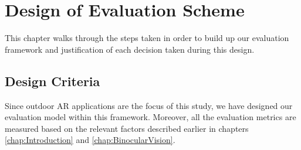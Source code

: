 \chapter{Design of Evaluation Scheme}
\label{chap:System}

This chapter walks through the steps taken in order to build up our evaluation framework and justification of each decision taken during this design.

\section{Design Criteria}

Since outdoor AR applications are the focus of this study, we have designed our evaluation model within this framework. Moreover, all the evaluation
metrics are measured based on the relevant factors described earlier in chapters \ref{chap:Introduction} and \ref{chap:BinocularVision}.







